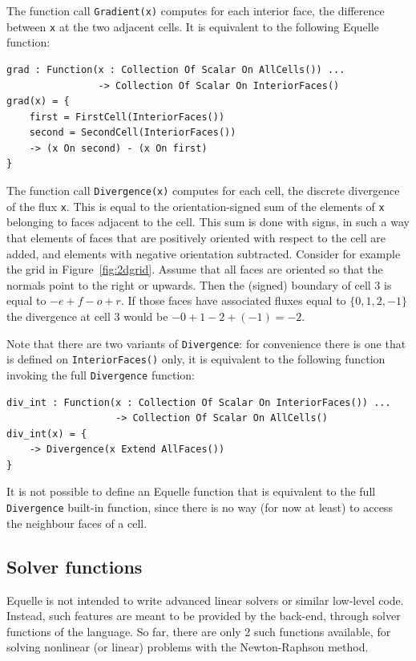 \documentclass[11pt]{article}
\newcommand{\code}[1]{\texttt{#1}}
\begin{document}
The function call \code{Gradient(x)} computes for each interior face, the difference
between \code{x} at the two adjacent cells. It is equivalent to the following Equelle
function:

\begin{verbatim}
grad : Function(x : Collection Of Scalar On AllCells()) ...
                -> Collection Of Scalar On InteriorFaces()
grad(x) = {
    first = FirstCell(InteriorFaces())
    second = SecondCell(InteriorFaces())
    -> (x On second) - (x On first) 
}
\end{verbatim}

The function call \code{Divergence(x)} computes for each cell, the discrete divergence of
the flux \code{x}. This is equal to the orientation-signed sum of the elements of \code{x}
belonging to faces adjacent to the cell. This sum is done with signs, in such a way that
elements of faces that are positively oriented with respect to the cell are added, and
elements with negative orientation subtracted. Consider for example the grid in
Figure~\ref{fig:2dgrid}. Assume that all faces are oriented so that the normals point to
the right or upwards. Then the (signed) boundary of cell 3 is equal to $-e + f - o +
r$. If those faces have associated fluxes equal to $\{0, 1, 2, -1\}$ the divergence at
cell 3 would be $-0 + 1 - 2 + (-1) = -2$.

Note that there are two variants of \code{Divergence}: for convenience there is one that
is defined on \code{InteriorFaces()} only, it is equivalent to the following function
invoking the full \code{Divergence} function:

\begin{verbatim}
div_int : Function(x : Collection Of Scalar On InteriorFaces()) ...
                   -> Collection Of Scalar On AllCells()
div_int(x) = {
    -> Divergence(x Extend AllFaces())
}
\end{verbatim}

It is not possible to define an Equelle function that is equivalent to the full
\code{Divergence} built-in function, since there is no way (for now at least) to access
the neighbour faces of a cell.

\subsection{Solver functions}

Equelle is not intended to write advanced linear solvers or similar low-level
code. Instead, such features are meant to be provided by the back-end, through solver
functions of the language. So far, there are only 2 such functions available, for solving
nonlinear (or linear) problems with the Newton-Raphson method.
\end{document}

